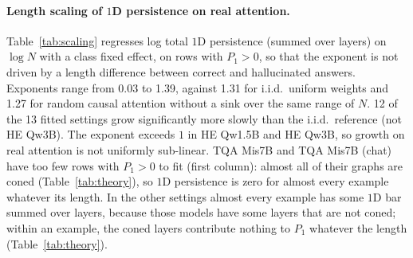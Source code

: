 \paragraph{Length scaling of $1$D persistence on real attention.} Table~\ref{tab:scaling} regresses log total $1$D persistence (summed over layers) on $\log N$ with a class fixed effect, on rows with $P_1>0$, so that the exponent is not driven by a length difference between correct and hallucinated answers. Exponents range from 0.03 to 1.39, against 1.31 for i.i.d.\ uniform weights and 1.27 for random causal attention without a sink over the same range of $N$. 12 of the 13 fitted settings grow significantly more slowly than the i.i.d.\ reference (not HE Qw3B). The exponent exceeds $1$ in HE Qw1.5B and HE Qw3B, so growth on real attention is not uniformly sub-linear. TQA Mis7B and TQA Mis7B (chat) have too few rows with $P_1>0$ to fit (first column): almost all of their graphs are coned (Table~\ref{tab:theory}), so $1$D persistence is zero for almost every example whatever its length. In the other settings almost every example has some $1$D bar summed over layers, because those models have some layers that are not coned; within an example, the coned layers contribute nothing to $P_1$ whatever the length (Table~\ref{tab:theory}).
